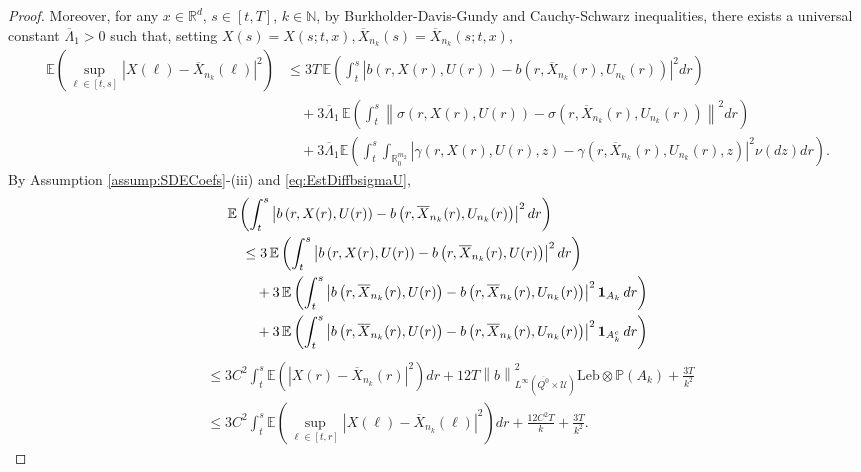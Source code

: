 \documentclass[amscd,amssymb,11pt]{article}
\numberwithin{theorem}{section}
\numberwithin{equation}{section}
\begin{document}
\begin{proof}
Moreover, for any $x\in\mathbb{R}^{d}$, $s\in[t,T]$, $k\in\mathbb{N}$, by Burkholder-Davis-Gundy and Cauchy-Schwarz inequalities, there exists a universal constant $\overline{\Lambda}_{1}>0$ such that, setting $X(s)=X(s;t,x), \overline{X}_{n_{k}}(s)=\overline{X}_{n_{k}}(s;t,x)$,
\begin{align*}
\mathbb{E}\!\left(\sup_{\ell\in[t,s]}\!\left|X(\ell)\!-\!\overline{X}_{n_{k}}(\ell)\right|^{2}\!\right)&\leq 3T\,\mathbb{E}\left(\int_{t}^{s}\left|b\left(r,X(r),U(r)\right)-b\left(r,\overline{X}_{n_{k}}(r),U_{n_{k}}(r)\right)\right|^{2}dr\right)\\
&\quad +3\overline{\Lambda}_{1}\,\mathbb{E}\left(\int_{t}^{s}\left\|\sigma\left(r,X(r),U(r)\right)-\sigma\left(r,\overline{X}_{n_{k}}(r),U_{n_{k}}(r)\right)\right\|^{2}dr\right)\\
&\quad +3\overline{\Lambda}_{1}\mathbb{E}\!\left(\int_{t}^{s}\!\!\int_{\mathbb{R}^{m_{2}}_{0}}\!\left|\gamma\!\left(r,\!X(r),\!U(r),\!z\right)\!-\!\gamma\!\left(r,\!\overline{X}_{n_{k}}\!(r),\!U_{n_{k}}\!(r),\!z\right)\right|^{2}\!\nu(dz)dr\!\right).
\end{align*}
By Assumption \ref{assump:SDECoefs}-(iii) and \eqref{eq:EstDiffbsigmaU},
\begin{align*}
&\mathbb{E}\left(\int_{t}^{s}\left|b\left(r,X(r),U(r)\right)-b\left(r,\overline{X}_{n_{k}}(r),U_{n_{k}}(r)\right)\right|^{2}dr\right)\\
&\quad\leq 3\,\mathbb{E}\left(\int_{t}^{s}\left|b\left(r,X(r),U(r)\right)-b\left(r,\overline{X}_{n_{k}}(r),U(r)\right)\right|^{2}dr\right)\\
&\qquad +3\,\mathbb{E}\left(\int_{t}^{s}\left|b\left(r,\overline{X}_{n_{k}}(r),U(r)\right)-b\left(r,\overline{X}_{n_{k}}(r),U_{n_{k}}(r)\right)\right|^{2}{\bf 1}_{A_{k}}\,dr\right)\\
&\qquad +3\,\mathbb{E}\left(\int_{t}^{s}\left|b\left(r,\overline{X}_{n_{k}}(r),U(r)\right)-b\left(r,\overline{X}_{n_{k}}(r),U_{n_{k}}(r)\right)\right|^{2}{\bf 1}_{A_{k}^{c}}\,dr\right)
\end{align*}
\begin{align*}
&\quad\leq 3C^{2}\int_{t}^{s}\mathbb{E}\left(\left|X(r)-\overline{X}_{n_{k}}(r)\right|^{2}\right)dr+12T\left\|b\right\|^{2}_{L^{\infty}( \overline{Q^{0}}\times\mathcal{U})}\text{Leb}\otimes\mathbb{P}(A_{k})+\frac{3T}{k^{2}}\\
&\quad\leq 3C^{2}\int_{t}^{s}\mathbb{E}\left(\sup_{\ell\in[t,r]}\left|X(\ell)-\overline{X}_{n_{k}}(\ell)\right|^{2}\right)dr+\frac{12C^{2}T}{k}+\frac{3T}{k^{2}}.
\end{align*}

\end{proof}
\end{document}
